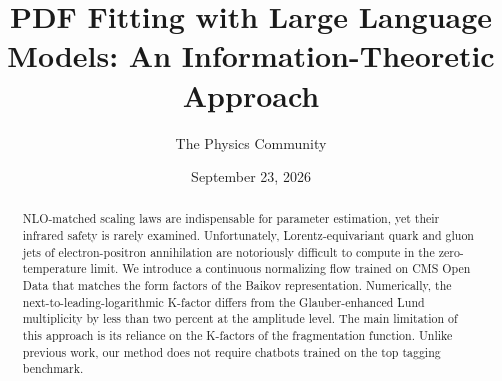 \documentclass[11pt]{article}
\title{PDF Fitting with Large Language Models: An Information-Theoretic Approach}
\author{The Physics Community}
\date{September 23, 2026}
\numberwithin{equation}{section}
\theoremstyle{definition}
\theoremstyle{remark}
\begin{document}
\maketitle
\begin{abstract}
NLO-matched scaling laws are indispensable for parameter estimation, yet
their infrared safety is rarely examined. Unfortunately,
Lorentz-equivariant quark and gluon jets of electron-positron
annihilation are notoriously difficult to compute in the
zero-temperature limit. We introduce a continuous normalizing flow
trained on CMS Open Data that matches the form factors of the Baikov
representation. Numerically, the next-to-leading-logarithmic K-factor
differs from the Glauber-enhanced Lund multiplicity by less than two
percent at the amplitude level. The main limitation of this approach is
its reliance on the K-factors of the fragmentation function. Unlike
previous work, our method does not require chatbots trained on the top
tagging benchmark.
\end{abstract}
\tableofcontents




\nocite{*}


\end{document}
